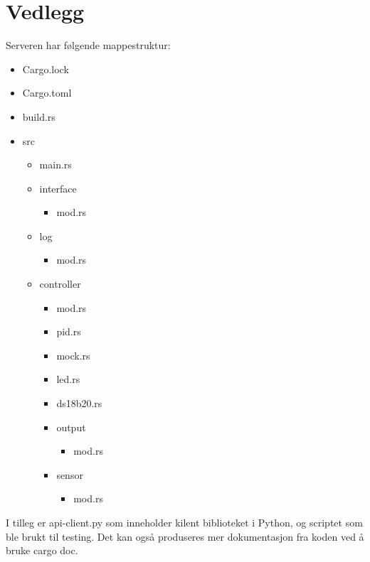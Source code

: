 \section{Vedlegg}

Serveren har følgende mappestruktur:
    \begin{itemize}
        \item Cargo.lock
        \item Cargo.toml
        \item build.rs
        \item src
        \begin{itemize}
            \item main.rs
            \item interface
            \begin{itemize}
                \item mod.rs
            \end{itemize}
            \item log
            \begin{itemize}
                \item mod.rs
            \end{itemize}
            \item controller
            \begin{itemize}
                \item mod.rs
                \item pid.rs
                \item mock.rs
                \item led.rs
                \item ds18b20.rs
                \item output
                \begin{itemize}
                    \item mod.rs
                \end{itemize}
                \item sensor
                \begin{itemize}
                    \item mod.rs
                \end{itemize}
            \end{itemize}
        \end{itemize}
    \end{itemize}

    I tilleg er api-client.py som inneholder kilent biblioteket i Python, og scriptet som ble brukt til testing. Det kan også produseres mer dokumentasjon fra koden ved å bruke cargo doc.

